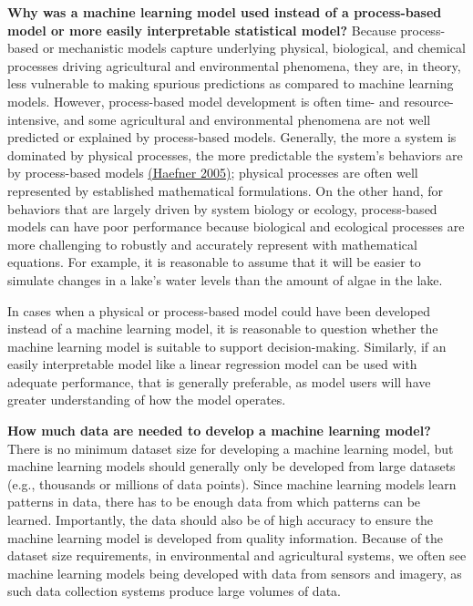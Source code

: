 \documentclass[
]{book}
\begin{document}
\textbf{Why was a machine learning model used instead of a process-based model or more easily interpretable statistical model?}
Because process-based or mechanistic models capture underlying physical, biological, and chemical processes driving agricultural and environmental phenomena, they are, in theory, less vulnerable to making spurious predictions as compared to machine learning models. However, process-based model development is often time- and resource-intensive, and some agricultural and environmental phenomena are not well predicted or explained by process-based models. Generally, the more a system is dominated by physical processes, the more predictable the system's behaviors are by process-based models \href{https://link.springer.com/book/10.1007/b106568}{(Haefner 2005)}; physical processes are often well represented by established mathematical formulations. On the other hand, for behaviors that are largely driven by system biology or ecology, process-based models can have poor performance because biological and ecological processes are more challenging to robustly and accurately represent with mathematical equations. For example, it is reasonable to assume that it will be easier to simulate changes in a lake's water levels than the amount of algae in the lake.

In cases when a physical or process-based model could have been developed instead of a machine learning model, it is reasonable to question whether the machine learning model is suitable to support decision-making. Similarly, if an easily interpretable model like a linear regression model can be used with adequate performance, that is generally preferable, as model users will have greater understanding of how the model operates.

\textbf{How much data are needed to develop a machine learning model?}
There is no minimum dataset size for developing a machine learning model, but machine learning models should generally only be developed from large datasets (e.g., thousands or millions of data points). Since machine learning models learn patterns in data, there has to be enough data from which patterns can be learned. Importantly, the data should also be of high accuracy to ensure the machine learning model is developed from quality information. Because of the dataset size requirements, in environmental and agricultural systems, we often see machine learning models being developed with data from sensors and imagery, as such data collection systems produce large volumes of data.
\end{document}

